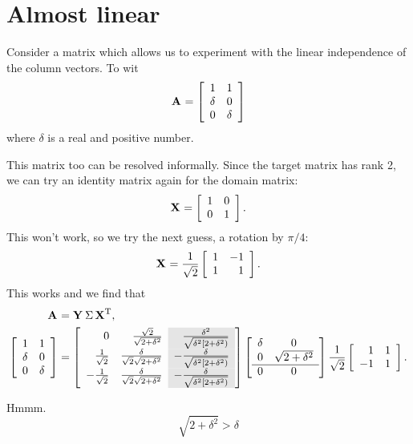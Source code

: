 \section{Almost linear}
Consider a matrix which allows us to experiment with the linear independence of the column vectors. To wit
\begin{equation}
  \A{} = \mat{cc}{1&1\\\delta&0\\0&\delta}
\end{equation}
where $\delta$ is a real and positive number.

This matrix too can be resolved informally. Since the target matrix has rank 2, we can try an identity matrix again for the domain matrix:
\begin{equation}
  \X{} = \itwo.
\end{equation}
This won't work, so we try the next guess, a rotation by $\pi/4$:
\begin{equation}
  \X{} = \stwo \mat{rr}{1&-1\\1&1}.
\end{equation}
This works and we find that
\begin{equation}
  \begin{split}
    \svda{T},\\
     \mat{cc}{1&1\\\delta&0\\0&\delta} & = 
\left[
\begin{array}{rr>{\columncolor{ltgray}}r}
 0 & \frac{\sqrt{2}}{\sqrt{2+\delta ^2}} & \frac{\delta ^2}{\sqrt{\delta ^2 \left[2+\delta ^2\right)}} \\
 \frac{1}{\sqrt{2}} & \frac{\delta }{\sqrt{2} \sqrt{2+\delta ^2}} & -\frac{\delta }{\sqrt{\delta ^2 \left[2+\delta ^2\right)}} \\
 -\frac{1}{\sqrt{2}} & \frac{\delta }{\sqrt{2} \sqrt{2+\delta ^2}} & -\frac{\delta }{\sqrt{\delta ^2 \left[2+\delta ^2\right)}}
\end{array}
\right]    
     \mat{cc} {\delta & 0 \\ 0 & \sqrt{2+\delta^{2}} \\\hline 0 & 0}
     \stwo \mat{rr}{1&1\\-1&1}.
  \end{split}
\end{equation}

Hmmm.
\begin{equation}
  \sqrt{2+\delta ^2} > \delta
\end{equation}

